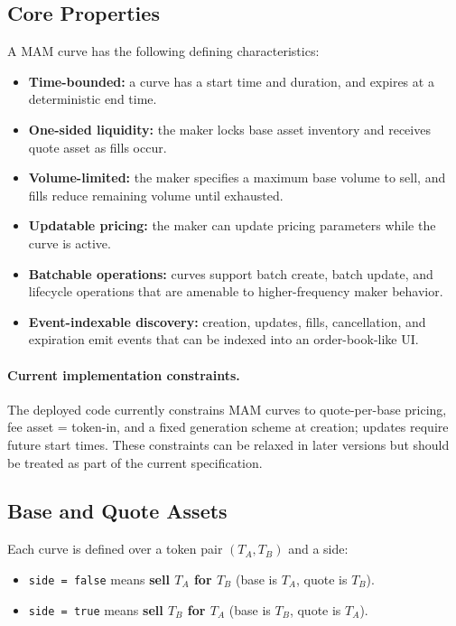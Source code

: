 \documentclass[version=preprint]{iacrcc}
\begin{document}
\subsection{Core Properties}

A MAM curve has the following defining characteristics:
\begin{itemize}
  \item \textbf{Time-bounded:} a curve has a start time and duration, and expires at a deterministic end time.
  \item \textbf{One-sided liquidity:} the maker locks base asset inventory and receives quote asset as fills occur.
  \item \textbf{Volume-limited:} the maker specifies a maximum base volume to sell, and fills reduce remaining volume until exhausted.
  \item \textbf{Updatable pricing:} the maker can update pricing parameters while the curve is active.
  \item \textbf{Batchable operations:} curves support batch create, batch update, and lifecycle operations that are amenable to higher-frequency maker behavior.
  \item \textbf{Event-indexable discovery:} creation, updates, fills, cancellation, and expiration emit events that can be indexed into an order-book-like UI.
\end{itemize}

\paragraph{Current implementation constraints.}
The deployed code currently constrains MAM curves to quote-per-base pricing, fee asset = token-in, and a fixed generation scheme at creation; updates require future start times. These constraints can be relaxed in later versions but should be treated as part of the current specification.

\subsection{Base and Quote Assets}

Each curve is defined over a token pair $(T_A, T_B)$ and a side:
\begin{itemize}
  \item \texttt{side = false} means \textbf{sell $T_A$ for $T_B$} (base is $T_A$, quote is $T_B$).
  \item \texttt{side = true} means \textbf{sell $T_B$ for $T_A$} (base is $T_B$, quote is $T_A$).
\end{itemize}
\end{document}

